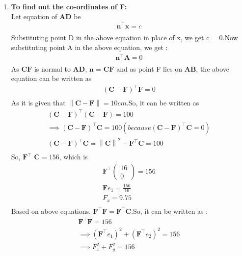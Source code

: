 \documentclass{article}
\providecommand{\norm}[1]{\left\lVert#1\right\rVert}
\newcommand{\myvec}[1]{\ensuremath{\begin{pmatrix}#1\end{pmatrix}}}
\let\vec\mathbf
\begin{document}
\begin{enumerate}
\item \textbf{To find out the co-ordinates of F:} \\
	Let equation of $\vec{AD}$ be \\
		\begin{align}
			\vec{n}^\top \vec{x} = c\\
		\end{align}
Substituting point D in the above equation in place of x, we get c = 0.Now substituting point A in the above equation, we get : \\
		\begin{align}
			\vec{n}^\top \vec{A} = 0 \\
		\end{align}
As $\vec{CF}$ is normal to $\vec{AD}$, $\vec{n}$ = $\vec{CF}$ and as point F lies on $\vec{AB}$, the above equation can be written as \\
		\begin{align}
			(\vec{C} - \vec{F})^\top \vec{F} = 0\\
		\end{align}
As it is given that $\norm{\vec{C} - \vec{F}} = 10cm$.So, it can be written as \\
		\begin{align}
			(\vec{C} - \vec{F})^\top (\vec{C} - \vec{F}) = 100\\
			\implies (\vec{C} - \vec{F})^\top \vec{C} = 100(because (\vec{C} - \vec{F})^\top \vec{C} = 0)\\
			(\vec{C} - \vec{F})^\top \vec{C} = \norm{\vec{C}}^2 - \vec{F}^\top \vec{C} = 100\\
		\end{align}
So, $\vec{F}^\top$ $\vec{C} = 156$, which is \\
		\begin{align}
			\vec{F}^\top\myvec{16\\0} = 156\\
			\vec{F} e_1 = \frac{156}{16}\\
			F_x = 9.75\\
		\end{align}
Based on above equations, $\vec{F}^\top \vec{F} = \vec{F}^\top \vec{C}$.So, it can be written as : \\
		\begin{align}
			\vec{F}^\top \vec{F} = 156\\
			\implies (\vec{F}^\top e_1)^2 + (\vec{F}^\top e_2)^2 = 156\\
			\implies F_x^2 + F_y^2 = 156 \\

\end{align}
\end{enumerate}
\end{document}
